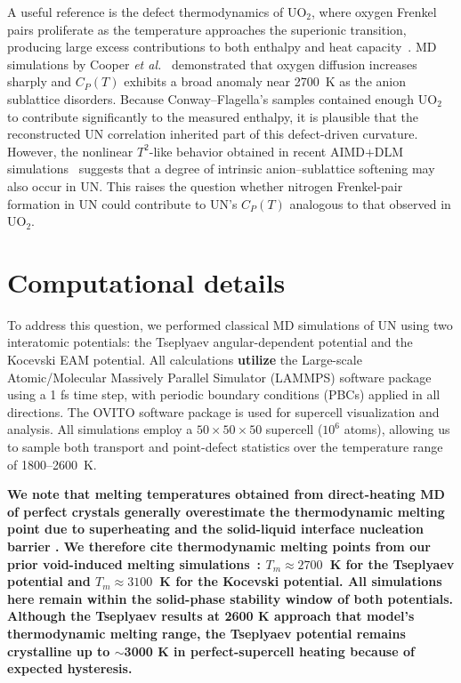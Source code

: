\documentclass[preprint,12pt,sort&compress]{elsarticle}
\newcommand{\?}{\stackrel{?}{=}}
\providecommand{\DIFaddtex}[1]{{\bf #1}} %
\providecommand{\DIFdeltex}[1]{} %
\providecommand{\DIFaddbegin}{\protect\color{blue}} %
\providecommand{\DIFaddend}{\protect\color{black}} %
\providecommand{\DIFdelbegin}{\protect\color{red}} %
\providecommand{\DIFdelend}{\protect\color{black}} %
\providecommand{\DIFadd}[1]{\texorpdfstring{\DIFaddtex{#1}}{#1}} %
\providecommand{\DIFdel}[1]{\texorpdfstring{\DIFdeltex{#1}}{}} %
\newcommand{\DIFscaledelfig}{0.5}
\newlength{\DIFdelgraphicswidth} %
\newlength{\DIFdelgraphicsheight} %
\newcommand{\DIFaddincludegraphics}[2][]{{\color{blue}\fbox{\DIFOincludegraphics[#1]{#2}}}} %
\newcommand{\DIFdelincludegraphics}[2][]{%
\sbox{\DIFdelgraphicsbox}{\DIFOincludegraphics[#1]{#2}}%
\settoboxwidth{\DIFdelgraphicswidth}{\DIFdelgraphicsbox} %
\settoboxtotalheight{\DIFdelgraphicsheight}{\DIFdelgraphicsbox} %
\scalebox{\DIFscaledelfig}{%
\parbox[b]{\DIFdelgraphicswidth}{\usebox{\DIFdelgraphicsbox}\\[-\baselineskip] \rule{\DIFdelgraphicswidth}{0em}}\llap{\resizebox{\DIFdelgraphicswidth}{\DIFdelgraphicsheight}{%
\setlength{\unitlength}{\DIFdelgraphicswidth}%
\begin{picture}(1,1)%
\thicklines\linethickness{2pt} %
{\color[rgb]{1,0,0}\put(0,0){\framebox(1,1){}}}%
{\color[rgb]{1,0,0}\put(0,0){\line( 1,1){1}}}%
{\color[rgb]{1,0,0}\put(0,1){\line(1,-1){1}}}%
\end{picture}%
}\hspace*{3pt}}} %
} %
\DeclareRobustCommand{\DIFaddbegin}{\DIFOaddbegin \let\includegraphics\DIFaddincludegraphics} %
\DeclareRobustCommand{\DIFaddend}{\DIFOaddend \let\includegraphics\DIFOincludegraphics} %
\DeclareRobustCommand{\DIFdelbegin}{\DIFOdelbegin \let\includegraphics\DIFdelincludegraphics} %
\DeclareRobustCommand{\DIFdelend}{\DIFOaddend \let\includegraphics\DIFOincludegraphics} %
\begin{document}
\DIFaddend A useful reference is the defect thermodynamics of UO$_2$, where oxygen Frenkel pairs proliferate as the temperature approaches the superionic transition, producing large excess contributions to both enthalpy and heat capacity~\cite{Pavlov2017}. MD simulations by Cooper \textit{et al.}~\cite{Cooper2014} demonstrated that oxygen diffusion increases sharply and $C_{P}(T)$ exhibits a broad anomaly near 2700~K as the anion sublattice disorders. Because Conway–Flagella's samples contained enough UO$_2$ to contribute significantly to the measured enthalpy, it is plausible that the reconstructed UN correlation inherited part of this defect-driven curvature. However, the nonlinear $T^{2}$-like behavior obtained in recent AIMD+DLM simulations~\cite{AbdulHameed2025} suggests that a degree of intrinsic anion–sublattice softening may also occur in UN. This raises the question whether nitrogen Frenkel-pair formation in UN could contribute to UN's $C_P(T)$ analogous to that observed in UO$_2$.

\section{Computational details}

To address this question, we performed classical MD simulations of UN using two interatomic potentials: the Tseplyaev angular-dependent potential \cite{Tseplyaev2016} and the Kocevski EAM potential. All calculations \DIFdelbegin \DIFdel{eutilize }\DIFdelend \DIFaddbegin \DIFadd{utilize }\DIFaddend the Large-scale Atomic/Molecular Massively Parallel Simulator (LAMMPS) software package \cite{Plimpton1995, Thompson2022} using a 1 fs time step, with periodic boundary conditions (PBCs) applied in all directions. The OVITO software package \cite{Stukowski2010} is used for supercell visualization and analysis. All simulations employ a $50 \times 50 \times 50$ supercell ($10^6$ atoms), allowing us to sample both transport and point-defect statistics over the  temperature range of 1800--2600~K.
\DIFaddbegin 

\DIFadd{We note that melting temperatures obtained from direct-heating MD of perfect crystals generally overestimate the thermodynamic melting point due to superheating and the solid-liquid interface nucleation barrier \cite{Alavi2006, Zhang2012}. We therefore cite thermodynamic melting points from our prior void-induced melting simulations~\cite{AbdulHameed2024}: $T_m \approx 2700$~K for the Tseplyaev potential and $T_m \approx 3100$~K for the Kocevski potential. All simulations here remain within the solid-phase stability window of both potentials. Although the Tseplyaev results at 2600 K approach that model's thermodynamic melting range, the Tseplyaev potential remains crystalline up to $\sim$3000 K in perfect-supercell heating because of expected hysteresis.
}
\end{document}
